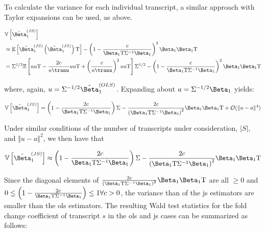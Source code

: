 To calculate the variance for each individual transcript, a similar approach with Taylor expansions can be used, as above.

\begin{align*}
   & \mathbb{V} \left[ \hat{\Beta}_1^{(JS)} \right]                                                                                         \\
   & \approx \mathbb{E} \left[ \hat{\Beta}_1^{(JS)}
  \left( \hat{\Beta}_1^{(JS)} \right)\tran \right]
  - \left(1 - \frac{c}{\Beta_1\tran \Sigma^{-1} \Beta_1} \right)^2 \Beta_1 \Beta_1\tran                                                     \\
   & = \Sigma^{1/2} \mathbb{E} \left[ u u\tran - \frac{2c}{u\tranu}uu\tran + \left( \frac{c}{u\tranu} \right)^2 uu\tran \right]\Sigma^{1/2}
  - \left(1 - \frac{c}{\Beta_1\tran \Sigma^{-1} \Beta_1} \right)^2 \Beta_1 \Beta_1\tran                                                     \\
\end{align*}

where, again, $u = \Sigma^{-1/2} \hat{\Beta}_1^{(OLS)}$.
Expanding about $a = \Sigma^{-1/2} \Beta_1$ yields:

\begin{equation*}
  \mathbb{V} \left [ \hat{\Beta}_1^{(JS)} \right]
  = \left(1 - \frac{2c}{\Beta_1\tran \Sigma^{-1} \Beta_1} \right) \Sigma
  - \frac{2c}{\left( \Beta_1\tran \Sigma^{-1} \Beta_1 \right)^2} \Beta_1 \Beta_1\tran
  + \mathcal{O}(\Vert u - a \Vert ^4)
\end{equation*}

Under similar conditions of the number of transcripts under consideration, $|S|$, and $\Vert u - a \Vert ^2$, we then have that

\begin{equation}
  \mathbb{V} \left [ \hat{\Beta}_1^{(JS)} \right]
  \approx \left(1 - \frac{2c}{\Beta_1\tran \Sigma^{-1} \Beta_1} \right) \Sigma
  - \frac{2c}{\left( \Beta_1\tran \Sigma^{-1} \Beta_1 \right)^2} \Beta_1 \Beta_1\tran
\end{equation}

Since the diagonal elements of $\frac{2c}{\left( \Beta_1\tran \Sigma^{-1} \Beta_1 \right)^2} \Beta_1 \Beta_1\tran$ are all $\ge 0$ and $0 \le \left(1 - \frac{2c}{\Beta_1\tran \Sigma^{-1} \Beta_1} \right) \le 1 \forall c > 0$, the variance than of the \gls{js} estimators are smaller than the \gls{ols} estimators.
The resulting Wald test statistics for the fold change coefficient of transcript $s$ in the \gls{ols} and \gls{js} cases can be summarized as follows:

